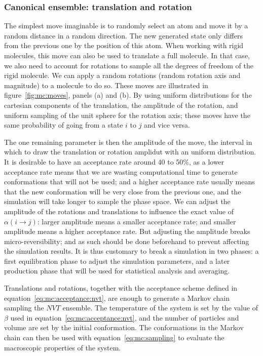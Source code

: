 \documentclass[thesis]{subfiles}
\begin{document}
\subsubsection{Canonical ensemble: translation and rotation}

The simplest move imaginable is to randomly select an atom and move it by a
random distance in a random direction. The new generated state only differs from
the previous one by the position of this atom. When working with rigid
molecules, this move can also be used to translate a full molecule. In that
case, we also need to account for rotations to sample all the degrees of freedom
of the rigid molecule. We can apply a random rotations (random rotation axis and
magnitude) to a molecule to do so. These moves are illustrated in
figure~\ref{fig:mc:moves}, panels (a) and (b). By using uniform distributions
for the cartesian components of the translation, the amplitude of the rotation,
and uniform sampling of the unit sphere for the rotation axis; these moves have
the same probability of going from a state $i$ to $j$ and vice versa.

The one remaining parameter is then the amplitude of the move, \ie the interval
in which to draw the translation or rotation amplidut with an uniform
distribution. It is desirable to have an acceptance rate around 40 to 50\%, as a
lower acceptance rate means that we are wasting computational time to generate
conformations that will not be used; and a higher acceptance rate usually means
that the new conformation will be very close from the previous one, and the
simulation will take longer to sample the phase space. We can adjust the
amplitude of the rotations and translations to influence the exact value of
$\alpha(i \to j)$: larger amplitude means a smaller acceptance rate; and smaller
amplitude means a higher acceptance rate. But adjusting the amplitude breaks
micro-reversibility; and as such should be done beforehand to prevent affecting
the simulation results. It is thus customary to break a simulation in two
phases: a first equilibration phase to adjust the simulation parameters, and a
later production phase that will be used for statistical analysis and averaging.

Translations and rotations, together with the acceptance scheme defined in
equation~\eqref{eq:mc:acceptance:nvt}, are enough to generate a Markov chain
sampling the $NVT$ ensemble. The temperature of the system is set by the value
of $\beta$ used in equation~\eqref{eq:mc:acceptance:nvt}, and the number of
particles and volume are set by the initial conformation. The conformations in
the Markov chain can then be used with equation~\eqref{eq:mc:sampling} to
evaluate the macroscopic properties of the system.
\end{document}
